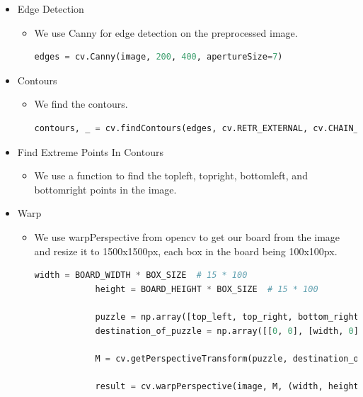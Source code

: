 \documentclass[12pt]{article}
\begin{document}
\begin{itemize}
\begin{itemize}
\begin{lstlisting}[language=Python, breaklines=true, breakatwhitespace=true, basicstyle=\small]
            \end{lstlisting}
        \end{itemize}
        \item Edge Detection
        \begin{itemize}
            \item We use Canny for edge detection on the preprocessed image.
            \begin{lstlisting}[language=Python, breaklines=true, breakatwhitespace=true, basicstyle=\small]
            edges = cv.Canny(image, 200, 400, apertureSize=7)
            \end{lstlisting}
        \end{itemize}
        \item Contours
        \begin{itemize}
            \item We find the contours.
            \begin{lstlisting}[language=Python, breaklines=true, breakatwhitespace=true, basicstyle=\small]
            contours, _ = cv.findContours(edges, cv.RETR_EXTERNAL, cv.CHAIN_APPROX_SIMPLE)
            \end{lstlisting}
        \end{itemize}
        \item Find Extreme Points In Contours
        \begin{itemize}
            \item We use a function to find the topleft, topright, bottomleft, and bottomright points in the image.
        \end{itemize}
        \item Warp
        \begin{itemize}
            \item We use warpPerspective from opencv to get our board from the image and resize it to 1500x1500px, each box in the board being 100x100px.
            \begin{lstlisting}[language=Python, breaklines=true, breakatwhitespace=true, basicstyle=\small]
            width = BOARD_WIDTH * BOX_SIZE  # 15 * 100
            height = BOARD_HEIGHT * BOX_SIZE  # 15 * 100

            puzzle = np.array([top_left, top_right, bottom_right, bottom_left], dtype="float32")
            destination_of_puzzle = np.array([[0, 0], [width, 0], [width, height], [0, height]], dtype="float32")

            M = cv.getPerspectiveTransform(puzzle, destination_of_puzzle)

            result = cv.warpPerspective(image, M, (width, height))
            \end{lstlisting}
        \end{itemize}
    \end{itemize}
\end{document}
